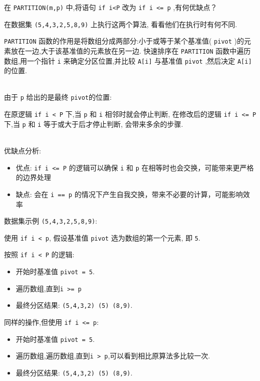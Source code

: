 \documentclass[../../main.tex]{subfiles}
\begin{document}
\begin{problem}
    在 \verb|PARTITION(m,p)| 中,将语句 \verb|if i<P| 改为 \verb|if i <= p| ,有何优缺点？

    在数据集 \verb|(5,4,3,2,5,8,9)| 上执行这两个算法, 看看他们在执行时有何不同.
\end{problem}
\begin{solution}

\verb|PARTITION| 函数的作用是将数组分成两部分:小于或等于某个基准值( \verb|pivot| )的元素放在一边,大于该基准值的元素放在另一边.
快速排序在 \verb|PARTITION| 函数中遍历数组,用一个指针 \verb|i| 来确定分区位置,并比较 \verb|A[i]| 与基准值 \verb|pivot| ,然后决定 \verb|A[i]| 的位置.

~\\
由于 \verb|p| 给出的是最终 \verb|pivot|的位置:

在原逻辑 \verb|if i < P| 下,当 \verb|p| 和 \verb|i| 相邻时就会停止判断,
在修改后的逻辑 \verb|if i <= P| 下,当 \verb|p| 和 \verb|i| 等于或大于后才停止判断, 会带来多余的步骤.

~\\
优缺点分析:
\begin{itemize}
    \item 优点: \verb|if i <= P| 的逻辑可以确保 \verb|i| 和 \verb|p| 在相等时也会交换，可能带来更严格的边界处理
    \item 缺点: 会在 \verb|i == p| 的情况下产生自我交换，带来不必要的计算，可能影响效率
\end{itemize}

数据集示例 \verb|(5,4,3,2,5,8,9)|:

使用 \verb|if i < p|, 假设基准值 \verb|pivot| 选为数组的第一个元素, 即 \verb|5|.

按照 \verb|if i < P| 的逻辑:
\begin{itemize}
    \item [1.] 开始时基准值 \verb|pivot = 5|.
    \item [2.] 遍历数组,直到\verb|i >= p|
    \item [3.] 最终分区结果: \verb|(5,4,3,2) (5) (8,9)|.
\end{itemize}

同样的操作,但使用 \verb|if i <= p|:
\begin{itemize}
\item [1.] 开始时基准值 \verb|pivot = 5|.
\item [2.] 遍历数组,遍历数组,直到\verb|i > p|,可以看到相比原算法多比较一次.
\item [3.] 最终分区结果: \verb|(5,4,3,2) (5) (8,9)|.
\end{itemize}
\end{solution}
\end{document}

